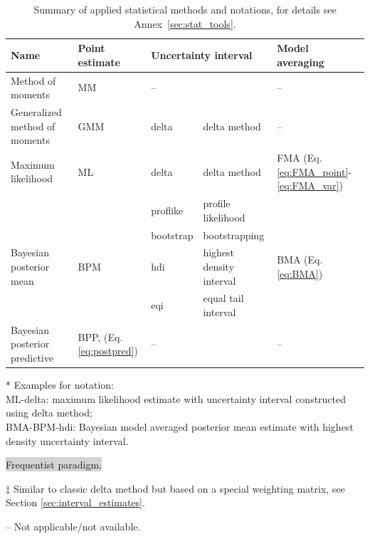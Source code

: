 \begin{table}
\caption{Summary of applied statistical methods and notations, for details see Annex~\ref{sec:stat_tools}.}
\centering
\label{tab:stat_methods_notations}
\small
	\begin{threeparttable}
    \begin{tabular}{lllll}
    \toprule
    Name\tnote{*} & Point estimate & \multicolumn{2}{l}{Uncertainty interval} & Model averaging \\
    \midrule
    Method of moments & MM  & -- & & -- \\
    \rowcolor{lightgrey}
    Generalized method of moments\tnote{\textdagger} & GMM  & delta & delta method\tnote{$\ddagger$} & -- \\ 
    \midrule
    \rowcolor{lightgrey}
    Maximum likelihood\tnote{\textdagger}  & ML  & delta & delta method & FMA (Eq.\ref{eq:FMA_point}-\ref{eq:FMA_var}) \\
    \rowcolor{lightgrey}
    ~ & ~  & proflike & profile likelihood  & ~ \\
    \rowcolor{lightgrey}
    ~ & ~  & bootstrap & bootstrapping  & ~  \\ 
    \midrule
    Bayesian posterior mean & BPM & hdi & highest density interval & BMA (Eq.\ref{eq:BMA}) \\
    ~ & ~ & eqi & equal tail interval & ~ \\
    Bayesian posterior predictive & BPP, (Eq.\ref{eq:postpred})& -- & & -- \\ 
    \bottomrule
    \end{tabular}
    \begin{tablenotes}
    \item[*] Examples for notation: \\
    ML-delta: maximum likelihood estimate with uncertainty interval constructed using delta method; \\
    BMA-BPM-hdi: Bayesian model averaged posterior mean estimate with highest density uncertainty interval.
    \item[\textdagger] \colorbox{lightgrey}{Frequentist paradigm.}
    \item[$\ddagger$] Similar to classic delta method but based on a special weighting matrix, see Section \ref{sec:interval_estimates}. 
    \item -- Not applicable/not available.
    \end{tablenotes}
    \end{threeparttable}
\end{table}

